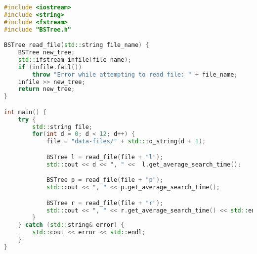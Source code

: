 \documentclass{article}
\begin{document}
\begin{lstlisting}[language=c++]
#include <iostream>
#include <string>
#include <fstream>
#include "BSTree.h"

BSTree read_file(std::string file_name) {      
    BSTree new_tree;
    std::ifstream infile(file_name); 
    if (infile.fail())
        throw "Error while attempting to read file: " + file_name;
    infile >> new_tree;
    return new_tree;
}

int main() {
    try {
        std::string file;
        for(int d = 0; d < 12; d++) {
            file = "data-files/" + std::to_string(d + 1);

            BSTree l = read_file(file + "l");
            std::cout << d << ", " <<  l.get_average_search_time();

            BSTree p = read_file(file + "p");
            std::cout << ", " << p.get_average_search_time();

            BSTree r = read_file(file + "r");
            std::cout << ", " << r.get_average_search_time() << std::endl;
        }
    } catch (std::string& error) {
        std::cout << error << std::endl;
    }
}
\end{lstlisting}
\end{document}
